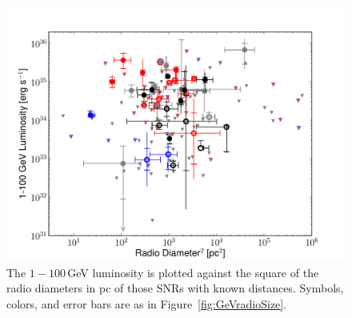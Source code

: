 \begin{figure}[h]
	\centering
	\includegraphics[width=1.0\columnwidth]{figures/lum_vs_dia2.pdf}
	\caption[$1-100$\,GeV luminosity vs. D$^2$ for SNRs with distance measurement.]{
		The $1-100$\,GeV luminosity is plotted against the square of the radio diameters in pc of those SNRs with known distances. Symbols, colors, and error bars are as in Figure~\ref{fig:GeVradioSize}.}
		\label{fig:LumDia}
\end{figure}

